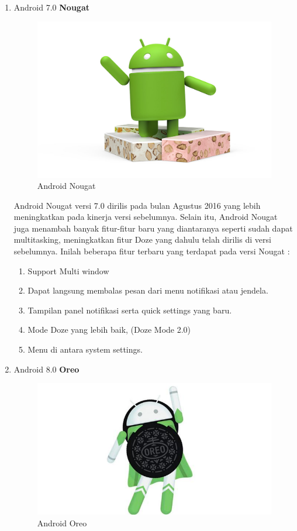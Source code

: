 \begin{enumerate}
\item Android 7.0 \textbf{Nougat}\\
\begin{figure}[!htbp]
    \centering
    \includegraphics[scale=0.3]{pictures/android-nougat.jpg}
    \caption{Android Nougat}
    \label{}
\end{figure}

Android Nougat versi 7.0 dirilis pada bulan Agustus 2016 yang lebih meningkatkan pada kinerja versi sebelumnya. Selain itu, Android Nougat juga menambah banyak fitur-fitur baru yang diantaranya seperti sudah dapat multitasking, meningkatkan fitur Doze yang dahulu telah dirilis di versi sebelumnya. Inilah beberapa fitur terbaru yang terdapat pada versi Nougat :
\begin{enumerate}
    \item Support Multi window
    \item Dapat langsung membalas pesan dari menu notifikasi atau jendela.
    \item Tampilan panel notifikasi serta quick settings yang baru.
    \item Mode Doze yang lebih baik, (Doze Mode 2.0)
    \item Menu di antara system settings.
\end{enumerate}

\item Android 8.0 \textbf{Oreo}
\begin{figure}[!htbp]
    \centering
    \includegraphics[scale=0.3]{pictures/android-oreo.jpg}
    \caption{Android Oreo}
    \label{}
\end{figure}


\end{enumerate}
